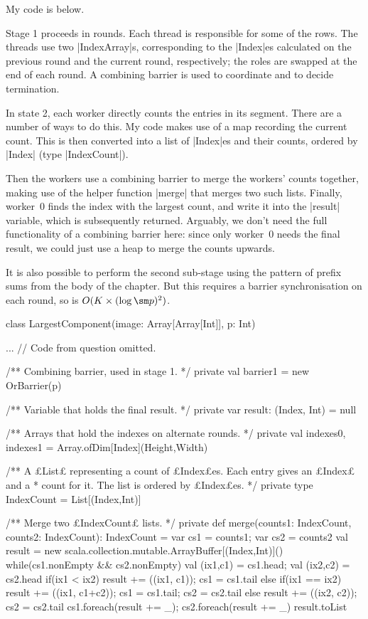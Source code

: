 \begin{answerI}
My code is below.  

Stage 1 proceeds in rounds.  Each thread is responsible for some of the rows.
The threads use two |IndexArray|s, corresponding to the |Index|es calculated
on the previous round and the current round, respectively; the roles are
swapped at the end of each round.  A combining barrier is used to coordinate
and to decide termination.

In state 2, each worker directly counts the entries in its segment.  There are
a number of ways to do this.  My code makes use of a map recording the current
count.  This is then converted into a list of |Index|es and their counts,
ordered by |Index| (type |IndexCount|).

Then the workers use a combining barrier to merge the workers' counts
together, making use of the helper function |merge| that merges two such
lists.  Finally, worker~0 finds the index with the largest count, and write it
into the |result| variable, which is subsequently returned.  Arguably, we
don't need the full functionality of a combining barrier here: since only
worker~0 needs the final result, we could just use a heap to merge the counts
upwards.

It is also possible to perform the second sub-stage using the pattern of
prefix sums from the body of the chapter.  But this requires a barrier
synchronisation on each round, so is  $O(K \times (\log \sm p)^2)$.



\begin{scala}
class LargestComponent(image: Array[Array[Int]], p: Int){
  ... // Code from question omitted. 

  /** Combining barrier, used in stage 1. */
  private val barrier1 = new OrBarrier(p)

  /** Variable that holds the final result. */
  private var result: (Index, Int) = null

  /** Arrays that hold the indexes on alternate rounds. */
  private val indexes0, indexes1 = Array.ofDim[Index](Height,Width)

  /** A £List£ representing a count of £Index£es.  Each entry gives an £Index£ and a
    * count for it.  The list is ordered by £Index£es. */
  private type IndexCount = List[(Index,Int)]

  /** Merge two £IndexCount£ lists. */
  private def merge(counts1: IndexCount, counts2: IndexCount): IndexCount = {
    var cs1 = counts1; var cs2 = counts2
    val result = new scala.collection.mutable.ArrayBuffer[(Index,Int)]()
    while(cs1.nonEmpty && cs2.nonEmpty){
      val (ix1,c1) = cs1.head; val (ix2,c2) = cs2.head
      if(ix1 < ix2){ result += ((ix1, c1)); cs1 = cs1.tail }
      else if(ix1 == ix2){ 
        result += ((ix1, c1+c2)); cs1 = cs1.tail; cs2 = cs2.tail 
      }
      else{ result += ((ix2, c2)); cs2 = cs2.tail }
    }
    cs1.foreach(result += _); cs2.foreach(result += _)
    result.toList
  }

}
\end{scala}
\end{answerI}
